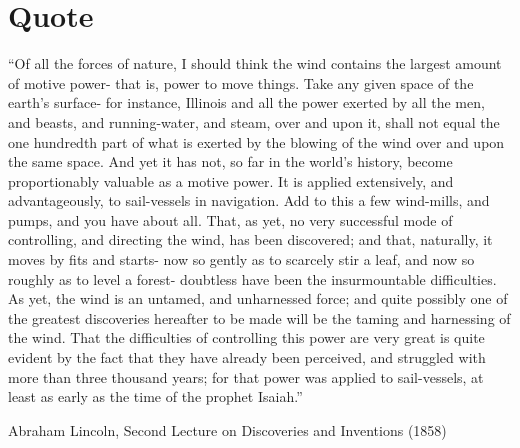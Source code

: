 \chapter{Quote}
\label{sec:quote}
\bigskip
\setlength{\epigraphwidth}{1.0\textwidth}
\epigraph
{``Of all the forces of nature, I should think the wind contains the largest amount of motive power- that is, power to move things. Take any given space of the earth's surface- for instance, Illinois and all the power exerted by all the men, and beasts, and running-water, and steam, over and upon it, shall not equal the one hundredth part of what is exerted by the blowing of the wind over and upon the same space. And yet it has not, so far in the world's history, become proportionably valuable as a motive power. It is applied extensively, and advantageously, to sail-vessels in navigation. Add to this a few wind-mills, and pumps, and you have about all. That, as yet, no very successful mode of controlling, and directing the wind, has been discovered; and that, naturally, it moves by fits and starts- now so gently as to scarcely stir a leaf, and now so roughly as to level a forest- doubtless have been the insurmountable difficulties. As yet, the wind is an untamed, and unharnessed force; and quite possibly one of the greatest discoveries hereafter to be made will be the taming and harnessing of the wind. That the difficulties of controlling this power are very great is quite evident by the fact that they have already been perceived, and struggled with more than three thousand years; for that power was applied to sail-vessels, at least as early as the time of the prophet Isaiah.''\bigskip \bigskip \bigskip}
{Abraham Lincoln, Second Lecture on Discoveries and Inventions (1858)}

